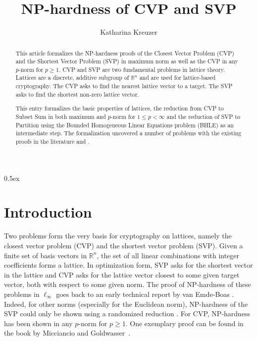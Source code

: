 \documentclass[11pt,a4paper]{article}
\begin{document}
\title{NP-hardness of CVP and SVP}
\author{Katharina Kreuzer}
\maketitle

\begin{abstract}
This article formalizes the NP-hardness proofs of the Closest Vector Problem (CVP) and the Shortest Vector Problem (SVP) in maximum norm as well as the CVP in any $p$-norm for $p\geq1$. 
CVP and SVP are two fundamental problems in lattice theory. Lattices are a discrete, additive subgroup of $\mathbb{R}^n$ and are used for lattice-based cryptography. The CVP asks to find the nearest lattice vector to a target. The SVP asks to find the shortest non-zero lattice vector. 

This entry formalizes the basic properties of lattices, the reduction from CVP to Subset Sum in both maximum and $p$-norm for $1\leq p<\infty$ and the reduction of SVP to Partition using the Bounded Homogeneous Linear Equations problem (BHLE) as an intermediate step. 
The formalization uncovered a number of problems with the existing proofs in the literature \cite{EmBo81} and \cite{Mic02}.
\end{abstract}


\newpage
\tableofcontents

\newpage
\parindent 0pt\parskip 0.5ex

\section{Introduction}
Two problems form the very basis for cryptography on lattices, namely the closest vector problem (CVP) and the shortest vector problem (SVP). 
Given a finite set of basis vectors in $\mathbb{R}^n$, the set of all linear combinations with integer coefficients forms a lattice. In optimization form, SVP asks for the shortest vector in the lattice and CVP asks for the lattice vector closest to some given target vector, both with respect to some given norm. 
The proof of NP-hardness of these problems in $\ell_\infty$ goes back to an early technical report by van Emde-Boas \cite{EmBo81}.
Indeed, for other norms (especially for the Euclidean norm), NP-hardness of the SVP could only be shown using a randomized reduction \cite{Ajt98}. For CVP, NP-hardness has been shown in any $p$-norm for $p\geq 1$. One exemplary proof can be found in the book by Micciancio and Goldwasser~\cite[Chapter 3, Thm 3.1]{Mic02}.
\end{document}
